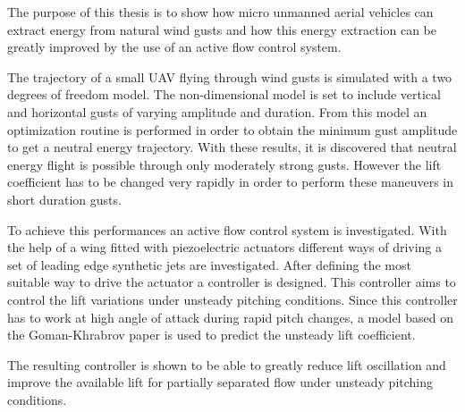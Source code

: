 \par The purpose of this thesis is to show how micro unmanned aerial vehicles can extract energy from natural wind gusts and how this energy extraction can be greatly improved by the use of an active flow control system.

\par The trajectory of a small UAV flying through wind gusts is simulated with a two degrees of freedom model.
The non-dimensional model is set to include vertical and horizontal gusts of varying amplitude and duration.
From this model an optimization routine is performed in order to obtain the minimum gust amplitude to get a neutral energy trajectory.
With these results, it is discovered that neutral energy flight is possible through only moderately strong gusts.
However the lift coefficient has to be changed very rapidly in order to perform these maneuvers in short duration gusts. 

\par To achieve this performances an active flow control system is investigated.
With the help of a wing fitted with piezoelectric actuators different ways of driving a set of leading edge synthetic jets are investigated.
After defining the most suitable way to drive the actuator a controller is designed. 
This controller aims to control the lift variations under unsteady pitching conditions.
Since this controller has to work at high angle of attack during rapid pitch changes, a model based on the Goman-Khrabrov paper \cite{GK} is used to predict the unsteady lift coefficient.

\par The resulting controller is shown to be able to greatly reduce lift oscillation and improve the available lift for partially separated flow under unsteady pitching conditions.
